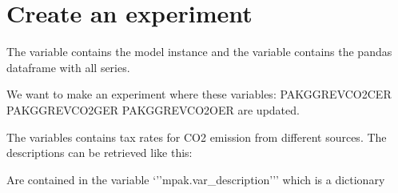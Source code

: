 \documentclass[letterpaper,10pt,english]{jupyterBook}
\begin{document}
\section{Create an experiment}
\label{\detokenize{content/howto/experiments/create_experiment:create-an-experiment}}
\sphinxAtStartPar
The variable  contains the model instance and the variable    contains the pandas dataframe with all series.

\sphinxAtStartPar
We want to make an experiment where these variables: PAKGGREVCO2CER PAKGGREVCO2GER PAKGGREVCO2OER are updated.

\sphinxAtStartPar
The  variables contains tax rates for CO2 emission from different sources. The descriptions can be retrieved like this:

\begin{sphinxShadowBox}

\sphinxAtStartPar
Are contained in the variable ‘’’mpak.var\_description’’’
which is a dictionary
\end{sphinxShadowBox}
\end{document}

